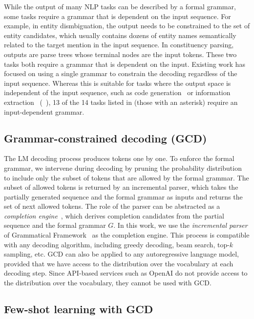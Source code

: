 While the output of many NLP tasks can be described by a formal grammar, some tasks require a grammar that is dependent on the input sequence.
For example, in entity dismbiguation, the output needs to be constrained to the set of entity candidates, which usually contains dozens of entity names semantically related to the target mention in the input sequence.
In constituency parsing, outputs are parse trees whose terminal nodes are the input tokens.
These two tasks both require a grammar that is dependent on the input.
%
Existing work has focused on using a single grammar to constrain the decoding regardless of the input sequence.
Whereas this is suitable for tasks where the output space is independent of the input sequence, such as code generation~\cite{poesia2022synchromesh} or information extraction~\cite{josifoski-etal-2022-genie} (\cf\ ),
13 of the 14 tasks listed in  (those with an asterisk) require an input-dependent grammar.


\subsection{Grammar-constrained decoding (GCD)}\label{subsec:grammar-constrained-decoding}

The LM decoding process produces tokens one by one.
To enforce the formal grammar, we intervene during decoding by pruning the probability distribution to include only the subset of tokens that are allowed by the formal grammar.
The subset of allowed tokens is returned by an incremental parser, which takes the partially generated sequence and the formal grammar as inputs and returns the set of next allowed tokens.
The role of the parser can be abstracted as a \textit{completion engine}~\cite{poesia2022synchromesh}, which derives completion candidates from the partial sequence and the formal grammar $G$.
In this work, we use the \textit{incremental parser} of Grammatical Framework~\cite{angelov-2009-incremental} as the completion engine.
This process is compatible with any decoding algorithm, including greedy decoding, beam search, top-$k$ sampling, etc.
GCD can also be applied to any autoregressive language model, provided that we have access to the distribution over the vocabulary at each decoding step.
Since API-based services such as OpenAI do not provide access to the distribution over the vocabulary, they cannot be used with GCD.

\subsection{Few-shot learning with GCD}\label{subsec:few-shot-learning-with-gcd}

